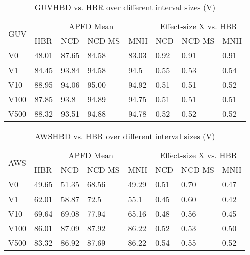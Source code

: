 \documentclass[1p]{elsarticle}
\begin{document}
\begin{table} [H]
\centering
\caption {GUV\textendash HBD vs. HBR over different interval sizes (V)}
\label{table:rq3_p2}
  \begin{tabular}{|l|l|l|l|l|l|l|l|}
    \hline
    \multirow{2}{*}{GUV} &
      \multicolumn{4}{c|}{APFD Mean} &
      \multicolumn{3}{c|}{Effect-size X vs. HBR} \\
    & HBR & NCD & NCD-MS & MNH & NCD & NCD-MS & MNH \\
    \hline
    \hline
	V0&48.01&87.65&84.58&83.03&0.92\cellcolor{Gray}&0.91\cellcolor{Gray}&0.91\cellcolor{Gray}\\
	\hline
	V1&84.45&93.84&94.58&94.5&0.55\cellcolor{Gray}&0.53\cellcolor{Gray}&0.54\cellcolor{Gray}\\
	\hline
	V10&88.95&94.06&95.00&94.92&0.51\cellcolor{Gray}&0.51\cellcolor{Gray}&0.52\cellcolor{Gray}\\
	\hline
	V100&87.85&93.8&94.89&94.75&0.51\cellcolor{Gray}&0.51\cellcolor{Gray}&0.51\cellcolor{Gray}\\
	\hline
	V500&88.32&93.51&94.88&94.78&0.52\cellcolor{Gray}&0.52\cellcolor{Gray}&0.52\cellcolor{Gray}\\
	\hline
  \end{tabular}
\end{table}

\begin{table} [H]
\centering
\caption {AWS\textendash HBD vs. HBR over different interval sizes (V)}
\label{table:rq3_p3}
  \begin{tabular}{|l|l|l|l|l|l|l|l|}
    \hline
    \multirow{2}{*}{AWS} &
      \multicolumn{4}{c|}{APFD Mean} &
      \multicolumn{3}{c|}{Effect-size X vs. HBR} \\
    & HBR & NCD & NCD-MS & MNH & NCD & NCD-MS & MNH \\
    \hline
    \hline
	V0&49.65&51.35&68.56&49.29&0.51&0.70\cellcolor{Gray}&0.47\\
	\hline
	V1&62.01&58.87&72.5&55.1&0.45&0.60\cellcolor{Gray}&0.42\cellcolor{Gray}\\
	\hline
	V10&69.64&69.08&77.94&65.16&0.48&0.56\cellcolor{Gray}&0.45\\
	\hline
	V100&86.01&87.09&87.92&86.22&0.52&0.53&0.50\\
	\hline
	V500&83.32&86.92&87.69&86.22&0.54\cellcolor{Gray}&0.55\cellcolor{Gray}&0.52\\
	\hline

  \end{tabular}
\end{table}
\end{document}
